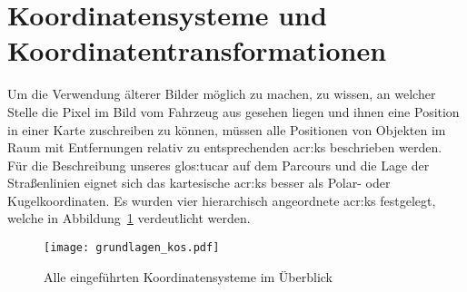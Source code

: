 \section{Koordinatensysteme und Koordinatentransformationen} \label{sec:ks}


Um die Verwendung älterer Bilder möglich zu machen, zu wissen, an welcher Stelle die Pixel im Bild vom Fahrzeug aus gesehen liegen und ihnen eine Position in einer Karte zuschreiben zu können, müssen alle Positionen von Objekten im Raum mit Entfernungen relativ zu entsprechenden \gls{acr:ks} beschrieben werden. Für die Beschreibung unseres \gls{glos:tucar} auf dem Parcours und die Lage der Straßenlinien eignet sich das kartesische \gls{acr:ks} besser als Polar- oder Kugelkoordinaten. Es wurden vier hierarchisch angeordnete \gls{acr:ks} festgelegt, welche in Abbildung~\ref{fig:grundlagen_kos} verdeutlicht werden. %

\begin{figure}[H] %
  \centering
  \texttt{[image: grundlagen\_kos.pdf]}
  \caption{Alle eingeführten Koordinatensysteme im Überblick}
  \label{fig:grundlagen_kos}
\end{figure}

